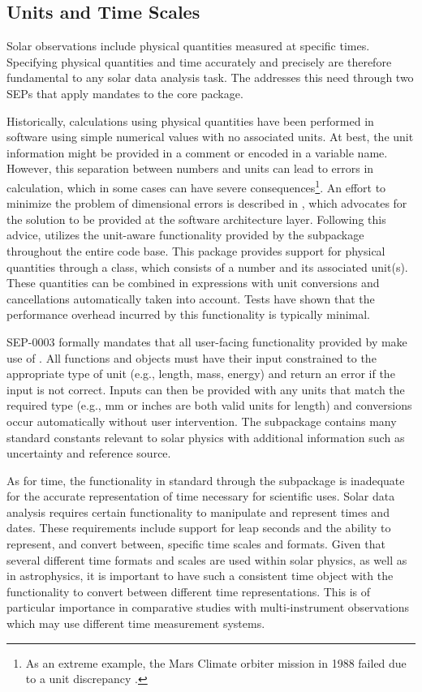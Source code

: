 \subsection{Units and Time Scales}
\label{sec:units}

Solar observations include physical quantities measured at specific times.
Specifying physical quantities and time accurately and precisely are therefore fundamental to any solar data analysis task.
The \sunpyproj addresses this need through two SEPs that apply mandates to the \sunpypkg core package.

Historically, calculations using physical quantities have been performed in software using simple numerical values with no associated units.
At best, the unit information might be provided in a comment or encoded in a variable name.
However, this separation between numbers and units can lead to errors in calculation, which in some cases can have severe consequences\footnote{As an extreme example, the Mars Climate orbiter mission in 1988 failed due to a unit discrepancy \citep{mco_mishap_report}.}.
An effort to minimize the problem of dimensional errors is described in \citet{Damevski2009}, which advocates for the solution to be provided at the software architecture layer.
Following this advice, \sunpypkg utilizes the unit-aware functionality provided by the  subpackage throughout the entire code base.
This package provides support for physical quantities through a  class, which consists of a number and its associated unit(s).
These quantities can be combined in expressions with unit conversions and cancellations automatically taken into account.
Tests have shown that the performance overhead incurred by this functionality is typically minimal.

SEP-0003 \citep{sep-0003} formally mandates that all user-facing functionality provided by \sunpypkg make use of .
All functions and objects must have their input constrained to the appropriate type of unit (e.g., length, mass, energy) and return an error if the input is not correct.
Inputs can then be provided with any units that match the required type (e.g., mm or inches are both valid units for length) and conversions occur automatically without user intervention.
The  subpackage contains many standard constants relevant to solar physics with additional information such as uncertainty and reference source.

As for time, the functionality in standard \python through the  subpackage is inadequate for the accurate representation of time necessary for scientific uses.
Solar data analysis requires certain functionality to manipulate and represent times and dates.
These requirements include support for leap seconds and the ability to represent, and convert between, specific time scales and formats.
Given that several different time formats and scales are used within solar physics, as well as in astrophysics, it is important to have such a consistent time object with the functionality to convert between different time representations.
This is of particular importance in comparative studies with multi-instrument observations which may use different time measurement systems.

